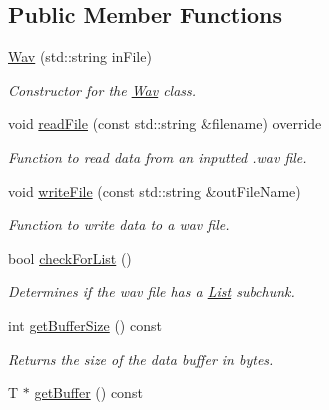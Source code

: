 \subsection*{Public Member Functions}
\begin{DoxyCompactItemize}
\item 
\hyperlink{classWav_ab265f0e3e012960f531ed5ff242c4e52}{Wav} (std\+::string in\+File)
\begin{DoxyCompactList}\small\item\em Constructor for the \hyperlink{classWav}{Wav} class. \end{DoxyCompactList}\item 
void \hyperlink{classWav_a636a94bf0f23a4cdc9d8d59d9d567f3e}{read\+File} (const std\+::string \&filename) override
\begin{DoxyCompactList}\small\item\em Function to read data from an inputted .wav file. \end{DoxyCompactList}\item 
void \hyperlink{classWav_afbae07371a8e0f17cc8e3a29507016e3}{write\+File} (const std\+::string \&out\+File\+Name)
\begin{DoxyCompactList}\small\item\em Function to write data to a wav file. \end{DoxyCompactList}\item 
\mbox{\label{classWav_ae484d2f0d2ce244ed23b99be6ea43977}} 
bool \hyperlink{classWav_ae484d2f0d2ce244ed23b99be6ea43977}{check\+For\+List} ()
\begin{DoxyCompactList}\small\item\em Determines if the wav file has a \hyperlink{structList}{List} subchunk. \end{DoxyCompactList}\item 
\mbox{\label{classWav_afd1ee6d72bb1bac1284a0df3ae7d9cea}} 
int \hyperlink{classWav_afd1ee6d72bb1bac1284a0df3ae7d9cea}{get\+Buffer\+Size} () const
\begin{DoxyCompactList}\small\item\em Returns the size of the data buffer in bytes. \end{DoxyCompactList}\item 
\mbox{\label{classWav_adc3bc9bcc037ff83bc7544715e70e144}} 
T $\ast$ \hyperlink{classWav_adc3bc9bcc037ff83bc7544715e70e144}{get\+Buffer} () const

\end{DoxyCompactItemize}

